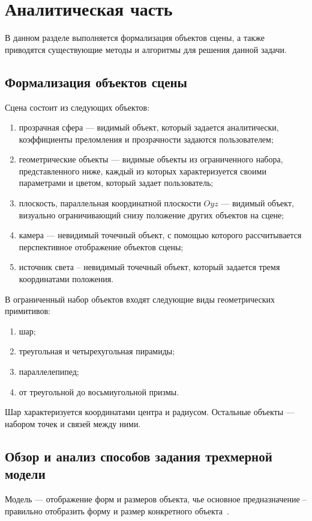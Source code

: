 \section{Аналитическая часть}
В данном разделе выполняется формализация объектов сцены, а также приводятся существующие методы и алгоритмы для решения данной задачи.

\subsection{Формализация объектов сцены}
Сцена состоит из следующих объектов:
\begin{enumerate}
	\item прозрачная сфера --- видимый объект, который задается аналитически, коэффициенты преломления и прозрачности задаются пользователем;
	\item геометрические объекты --- видимые объекты из ограниченного набора, представленного ниже, каждый из которых характеризуется своими параметрами и цветом, который задает пользователь;
	\item плоскость, параллельная координатной плоскости $Oyz$ --- видимый объект, визуально ограничивающий снизу положение других объектов на сцене;
	\item камера --- невидимый точечный объект, с помощью которого рассчитывается перспективное отображение объектов сцены;
	\item источник света -- невидимый точечный объект, который задается тремя координатами положения.
\end{enumerate}

В ограниченный набор объектов входят следующие виды геометрических примитивов:
\begin{enumerate}
	\item шар;
	\item треугольная и четырехугольная пирамиды;
	\item параллелепипед;
	\item от треугольной до восьмиугольной призмы.
\end{enumerate}

Шар характеризуется координатами центра и радиусом. Остальные объекты --- набором точек и связей между ними.


\subsection{Обзор и анализ способов задания трехмерной модели}
Модель --- отображение форм и размеров объекта, чье основное предназначение -- правильно отобразить форму и размер конкретного объекта~\cite{Kurov}. 

